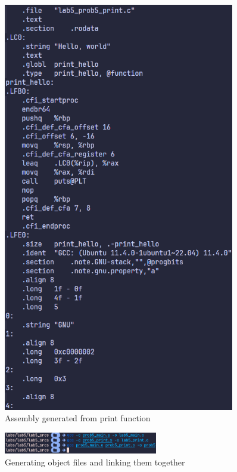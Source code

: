 \documentclass{article}
\begin{document}
\begin{minipage}{0.5\textwidth}
    \begin{figure}[H]
        \centering
        \includegraphics[width=0.9\textwidth]{../images/prob5_code2.png}
        \caption{Assembly generated from print function}
    \end{figure}
\end{minipage}

\begin{figure}[H]
    \centering
    \includegraphics[width=0.6\textwidth]{../images/prob5_compile.png}
    \caption{Generating object files and linking them together}
\end{figure}
\end{document}
